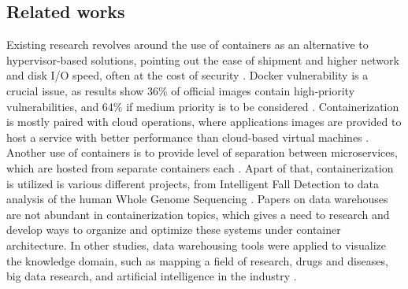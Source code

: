 \subsection{Related works}
Existing research revolves around the use of containers as an alternative to hypervisor-based solutions, pointing out the ease of shipment and higher network and disk I/O speed, often at the cost of security \cite{dockerVuln} \cite{hypervisorVsContainer}. Docker vulnerability is a crucial issue, as results show 36\% of official images contain high-priority vulnerabilities, and 64\% if medium priority is to be considered \cite{vuln30}. Containerization is mostly paired with cloud operations, where applications images are provided to host a service with better performance than cloud-based virtual machines \cite{performanceEval}. Another use of containers is to provide level of separation between microservices, which are hosted from separate containers each \cite{microservices}. Apart of that, containerization is utilized is various different projects, from Intelligent Fall Detection \cite{fallDetection} to data analysis of the human Whole Genome Sequencing \cite{genom}. Papers on data warehouses are not abundant in containerization topics, which gives a need to research and develop ways to organize and optimize these systems under container architecture. In other studies, data warehousing tools were applied to visualize the knowledge domain, such as mapping a field of research, drugs and diseases, big data research, and artificial intelligence in the industry \cite{dawak}.